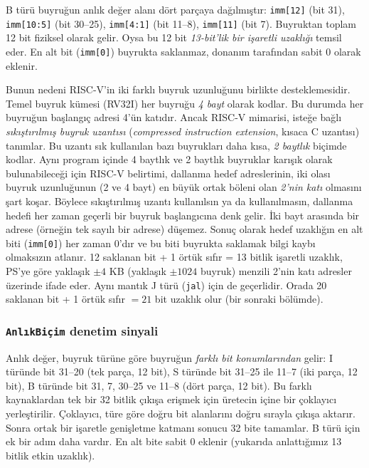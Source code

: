B türü buyruğun anlık değer alanı dört parçaya dağılmıştır: \texttt{imm[12]} (bit 31), \texttt{imm[10:5]} (bit 30--25), \texttt{imm[4:1]} (bit 11--8), \texttt{imm[11]} (bit 7). Buyruktan toplam 12 bit fiziksel olarak gelir. Oysa bu 12 bit \emph{13-bit'lik bir işaretli uzaklığı} temsil eder. En alt bit (\texttt{imm[0]}) buyrukta saklanmaz, donanım tarafından sabit 0 olarak eklenir.

Bunun nedeni RISC-V'in iki farklı buyruk uzunluğunu birlikte desteklemesidir. Temel buyruk kümesi (RV32I) her buyruğu \emph{4 bayt} olarak kodlar. Bu durumda her buyruğun başlangıç adresi 4'ün katıdır. Ancak RISC-V mimarisi, isteğe bağlı \emph{sıkıştırılmış buyruk uzantısı} (\emph{compressed instruction extension}, kısaca C uzantısı) tanımlar. Bu uzantı sık kullanılan bazı buyrukları daha kısa, \emph{2 baytlık} biçimde kodlar. Aynı program içinde 4 baytlık ve 2 baytlık buyruklar karışık olarak bulunabileceği için RISC-V belirtimi, dallanma hedef adreslerinin, iki olası buyruk uzunluğunun (2 ve 4 bayt) en büyük ortak böleni olan \emph{2'nin katı} olmasını şart koşar. Böylece sıkıştırılmış uzantı kullanılsın ya da kullanılmasın, dallanma hedefi her zaman geçerli bir buyruk başlangıcına denk gelir. İki bayt arasında bir adrese (örneğin tek sayılı bir adrese) düşemez. Sonuç olarak hedef uzaklığın en alt biti (\texttt{imm[0]}) her zaman 0'dır ve bu biti buyrukta saklamak bilgi kaybı olmaksızın atlanır. 12 saklanan bit + 1 örtük sıfır = 13 bitlik işaretli uzaklık, PS'ye göre yaklaşık $\pm 4$ KB (yaklaşık $\pm 1024$ buyruk) menzili 2'nin katı adresler üzerinde ifade eder. Aynı mantık J türü (\texttt{jal}) için de geçerlidir. Orada 20 saklanan bit + 1 örtük sıfır $= 21$ bit uzaklık olur (bir sonraki bölümde).

\subsubsection*{\texttt{AnlıkBiçim} denetim sinyali}

Anlık değer, buyruk türüne göre buyruğun \emph{farklı bit konumlarından} gelir: I türünde bit 31--20 (tek parça, 12 bit), S türünde bit 31--25 ile 11--7 (iki parça, 12 bit), B türünde bit 31, 7, 30--25 ve 11--8 (dört parça, 12 bit). Bu farklı kaynaklardan tek bir 32 bitlik çıkışa erişmek için üretecin içine bir çoklayıcı yerleştirilir. Çoklayıcı, türe göre doğru bit alanlarını doğru sırayla çıkışa aktarır. Sonra ortak bir işaretle genişletme katmanı sonucu 32 bite tamamlar. B türü için ek bir adım daha vardır. En alt bite sabit 0 eklenir (yukarıda anlattığımız 13 bitlik etkin uzaklık).

